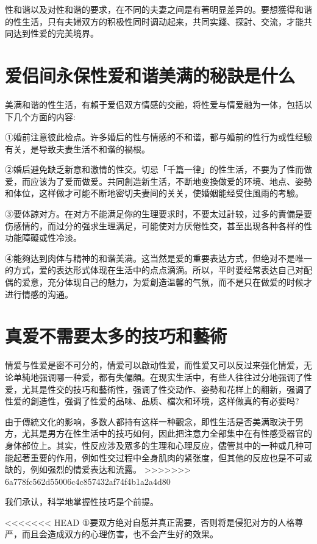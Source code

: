 \documentclass[12pt,UTF8]{ctexbook}
\begin{document}
性和谐以及对性和谐的要求，在不同的夫妻之间是有著明显差异的。要想獲得和谐的性生活，只有夫婦双方的积极性同时调动起来，共同实踐、探討、交流，才能共同达到性爱的完美境界。

\section{爱侣间永保性爱和谐美满的秘訣是什么}

美满和谐的性生活，有賴于爱侣双方情感的交融，将性爱与情爱融为一体，包括以下几个方面的内容:

①婚前注意彼此检点。许多婚后的性与情感的不和谐，都与婚前的性行为或性经驗有关，是导致夫妻生活不和谐的禍根。

②婚后避免缺乏新意和激情的性交。切忌「千篇一律」的性生活，不要为了性而做爱，而应该为了爱而做爱。共同創造新生活，不断地变換做爱的环境、地点、姿勢和体位，这样做才可能不断地密切夫妻间的关关，使婚姻能经受住風雨的考驗。

③要体諒对方。在对方不能满足你的生理要求时，不要太过計较，过多的責備是要伤感情的，而过分的强求生理满足，可能使对方厌倦性交，甚至出现各种各样的性功能障礙或性冷淡。

④能夠达到肉体与精神的和谐美满。这当然是爱的重要表达方式，但绝对不是唯一的方式，爱的表达形式体现在生活中的点点滴滴。所以，平时要经常表达自己对配偶的爱意，充分体现自己的魅力，为爱創造温馨的气氛，而不是只在做爱的时候才进行情感的沟通。

\section{真爱不需要太多的技巧和藝術}

情爱与性爱是密不可分的，情爱可以啟动性爱，而性爱又可以反过来强化情爱，无论单純地强调哪一种爱，都有失偏頗。在现实生活中，有些人往往过分地强调了性爱，尤其是性交的技巧和藝術性，强调了性交动作、姿勢和花样上的翻新，强调了性爱的創造性，强调了性爱的品味、品质、檔次和环境，这样做真的有必要吗?

由于傳統文化的影响，多数人都持有这样一种觀念，即性生活是否美满取決于男方，尤其是男方在性生活中的技巧如何，因此把注意力全部集中在有性感受器官的身体部位上。其实，性反应涉及眾多的生理和心理反应，儘管其中的一种或几种可能起著重要的作用，例如性交过程中全身肌肉的紧张度，但其他的反应也是不可或缺的，例如强烈的情爱表达和流露。
>>>>>>> 6a778fc562d55006c4c857432af74f4b1a2a4d80

我们承认，科学地掌握性技巧是个前提。

<<<<<<< HEAD
①要双方绝对自愿并真正需要，否则将是侵犯对方的人格尊严，而且会造成双方的心理伤害，也不会产生好的效果。
\end{document}
